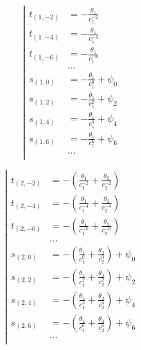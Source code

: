 \begin{equation*} \left| \begin{aligned}
t_{(1,-2)} &=
- \frac{\theta_1}{c_1^{-2}} \\
%
t_{(1,-4)} &=
- \frac{\theta_1}{c_1^{-4}} \\
%
t_{(1,-6)} &=
- \frac{\theta_1}{c_1^{-6}} \\
%
&\ldots \\
%
s_{(1,0)} &=
- \frac{\theta_1}{c_1^0}
+ \psi_0 \\
%
s_{(1,2)} &=
- \frac{\theta_1}{c_1^2}
+ \psi_2 \\
%
s_{(1,4)} &=
- \frac{\theta_1}{c_1^4}
+ \psi_4 \\
%
s_{(1,6)} &=
- \frac{\theta_1}{c_1^6}
+ \psi_6 \\
%
&\ldots \\
\end{aligned} \right. \end{equation*}

\begin{equation*} \left| \begin{aligned}
t_{(2,-2)} &=
- \left(
  \frac{\theta_1}{c_1^{-2}}
+ \frac{\theta_2}{c_2^{-2}} \right) \\
%
t_{(2,-4)} &=
- \left(
  \frac{\theta_1}{c_1^{-4}}
+ \frac{\theta_2}{c_2^{-4}} \right) \\
%
t_{(2,-6)} &=
- \left(
  \frac{\theta_1}{c_1^{-6}}
+ \frac{\theta_2}{c_2^{-6}} \right) \\
%
&\ldots \\
%
s_{(2,0)} &=
- \left(
  \frac{\theta_1}{c_1^0}
+ \frac{\theta_2}{c_2^0} \right)
+ \psi_0 \\
%
s_{(2,2)} &=
- \left(
  \frac{\theta_1}{c_1^2}
+ \frac{\theta_2}{c_2^2} \right)
+ \psi_2 \\
%
s_{(2,4)} &=
- \left(
  \frac{\theta_1}{c_1^4}
+ \frac{\theta_2}{c_2^4} \right)
+ \psi_4 \\
%
s_{(2,6)} &=
- \left(
  \frac{\theta_1}{c_1^6}
+ \frac{\theta_2}{c_2^6} \right)
+ \psi_6 \\
%
&\ldots \\
\end{aligned} \right. \end{equation*}

